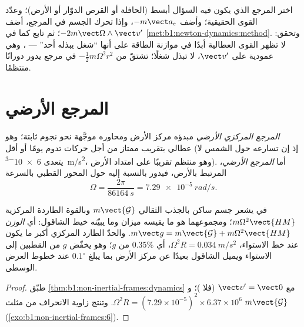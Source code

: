 \begin{method}\label{met:b1:non-inertial-frames:method}
اختر المرجع الذي يكون فيه السؤال أبسط (الحافلة أو
القرص الدوّار أو الأرض)؛ وعدّد القوى الحقيقية؛ وأضف $-m\vect a_e$، وإذا
تحرك الجسم في المرجع، أضف $-2m\vect\Omega\wedge\vect v'$؛ ثم تابع كما في
\cref{met:b1:newton-dynamics:method}. وتحقق: لا تظهر القوى العطالية أبدًا
في موازنة الطاقة على أنها ``شغل يبذله أحد'' --- ، وهي عمودية على $\vect v'$، لا تبذل شغلًا؛ 
تشتقّ من  $-\tfrac12 m\Omega^2r^2$ في مرجع يدور
دورانًا منتظمًا.
\end{method}

\section{المرجع الأرضي}

\begin{definition}\label{def:b1:non-inertial-frames:earth}
\emph{المرجع المركزي الأرضي} مبدؤه مركز الأرض
ومحاوره موجَّهة نحو نجوم ثابتة؛ وهو عطالي بتقريب ممتاز
من أجل حركات تدوم يومًا أو أقل (إذ إن تسارعه حول
الشمس لا يتعدى \qty{6e-3}{m/s^2}، وهو منتظم تقريبًا على امتداد الأرض).
أما \emph{المرجع الأرضي}، المرتبط بالأرض، فيدور بالنسبة
إليه حول المحور القطبي بالسرعة
\[
\Omega = \frac{2\pi}{\qty{86164}{s}} = \qty{7.29e-5}{rad/s} .
\]
\end{definition}

\begin{proposition}\label{prop:b1:non-inertial-frames:weight}
في  يشعر جسم ساكن بالجذب
الثقالي $m\vect{\mathcal G}$ وبالقوة الطاردة المركزية $m\Omega^2\vect{HM}$؛ ومجموعهما
هو ما يقيسه ميزان وما يبيّنه خيط الشاقول: أي \emph{الوزن}
$m\vect g = m\vect{\mathcal G} + m\Omega^2\vect{HM}$. والحدّ الطارد المركزي أكبر ما يكون
عند خط الاستواء، $\Omega^2R = \qty{0.034}{m/s^2}$، أي $0.35\%$ من $g$؛ وهو
يخفّض $g$ من القطبين إلى الاستواء ويميل الشاقول بعيدًا
عن مركز الأرض بما يبلغ $0.1^\circ$ عند خطوط العرض الوسطى.
\end{proposition}

\begin{proof}
طبّق \cref{thm:b1:non-inertial-frames:dynamics} مع $\vect v' = \vect 0$
(فلا )؛ و $\Omega^2R = (7.29\times10^{-5})^2 \times 6.37\times10^6$.
وتنتج زاوية الانحراف من مثلث $m\vect{\mathcal G}$  (\cref{exo:b1:non-inertial-frames:6}).
\end{proof}

